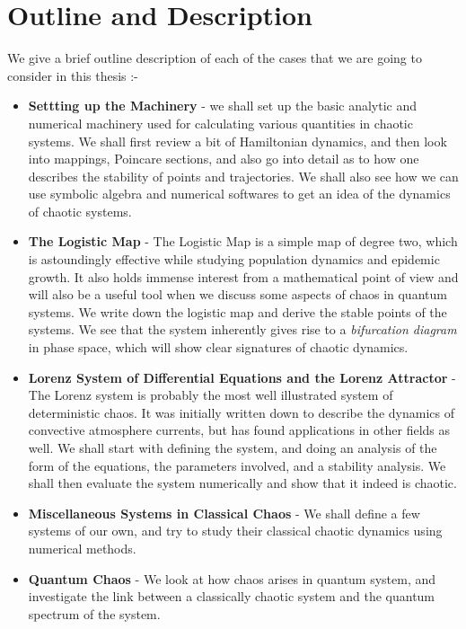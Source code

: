 \section{Outline and Description}
We give a brief outline description of each of the cases that we are going to consider in this thesis :-
\begin{itemize}
	\item \textbf{Settting up the Machinery} - we shall set up the basic analytic and numerical machinery used for calculating various quantities in chaotic systems. We shall first review a bit of Hamiltonian dynamics, and then look into mappings, Poincare sections, and also go into detail as to how one describes the stability of points and trajectories. We shall also see how we can use symbolic algebra and numerical softwares to get an idea of the dynamics of chaotic systems.
	
	\item \textbf{The Logistic Map} - The Logistic Map is a simple map of degree two, which is astoundingly effective while studying population dynamics and epidemic growth. It also holds immense interest from a mathematical point of view and will also be a useful tool when we discuss some aspects of chaos in quantum systems. We write down the logistic map and derive the stable points of the systems. We see that the system inherently gives rise to a \textit{bifurcation diagram} in phase space, which will show clear signatures of chaotic dynamics.
	
	\item \textbf{Lorenz System of Differential Equations and the Lorenz Attractor} - The Lorenz system is probably the most well illustrated system of deterministic chaos. It was initially written down to describe the dynamics of convective atmosphere currents, but has found applications in other fields as well. We shall start with defining the system, and doing an analysis of the form of the equations, the parameters involved, and a stability analysis. We shall then evaluate the system numerically and show that it indeed is chaotic.
	
	\item \textbf{Miscellaneous Systems in Classical Chaos} - We shall define a few systems of our own, and try to study their classical chaotic dynamics using numerical methods.
	
	\item \textbf{Quantum Chaos} - We look at how chaos arises in quantum system, and investigate the link between a classically chaotic system and the quantum spectrum of the system.
	

\end{itemize}
